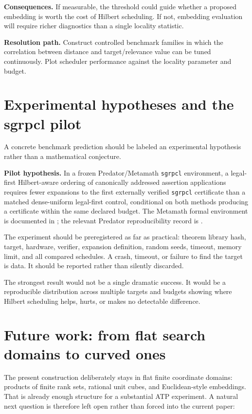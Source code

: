 \documentclass[11pt]{article}
\theoremstyle{hilberttheorem}
\begin{document}
\textbf{Consequences.} If measurable, the threshold could guide whether a proposed embedding is worth the cost of Hilbert scheduling. If not, embedding evaluation will require richer diagnostics than a single locality statistic.

\textbf{Resolution path.} Construct controlled benchmark families in which the correlation between distance and target/relevance value can be tuned continuously. Plot scheduler performance against the locality parameter and budget.

\section{Experimental hypotheses and the sgrpcl pilot}\label{sec:sgrpcl}
A concrete benchmark prediction should be labeled an experimental hypothesis rather than a mathematical conjecture.

\textbf{Pilot hypothesis.} In a frozen Predator/Metamath \texttt{sgrpcl} environment, a legal-first Hilbert-aware ordering of canonically addressed assertion applications requires fewer expansions to the first externally verified \texttt{sgrpcl} certificate than a matched dense-uniform legal-first control, conditional on both methods producing a certificate within the same declared budget. The Metamath formal environment is documented in \cite{metamath}; the relevant Predator reproducibility record is \cite{predatorrecord}.

The experiment should be preregistered as far as practical: theorem library hash, target, hardware, verifier, expansion definition, random seeds, timeout, memory limit, and all compared schedules. A crash, timeout, or failure to find the target is data. It should be reported rather than silently discarded.

The strongest result would not be a single dramatic success. It would be a reproducible distribution across multiple targets and budgets showing where Hilbert scheduling helps, hurts, or makes no detectable difference.

\section{Future work: from flat search domains to curved ones}\label{sec:future-curved}
The present construction deliberately stays in flat finite coordinate domains: products of finite rank sets, rational unit cubes, and Euclidean-style embeddings. That is already enough structure for a substantial ATP experiment. A natural next question is therefore left open rather than forced into the current paper:
\end{document}
